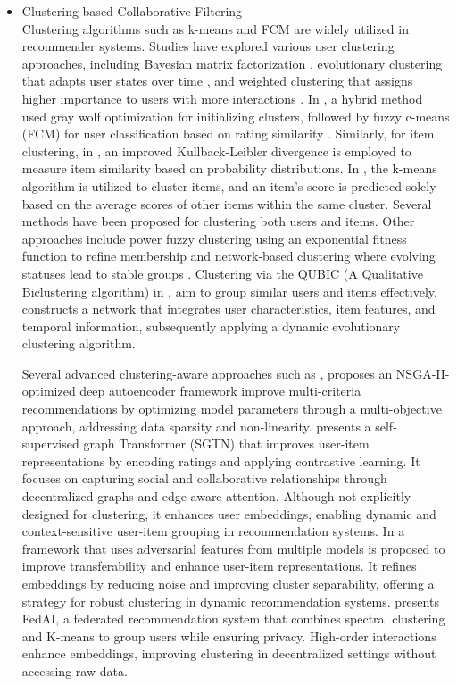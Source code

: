 \documentclass{article}
\theoremstyle{plain}
\theoremstyle{definition}
\theoremstyle{remark}
\begin{document}
\begin{itemize}
\item[a) ] Clustering-based Collaborative Filtering \\
Clustering algorithms such as k-means\cite{dakhel2011new, zahra2015novel, ranjan2018category, kant2017leaderrank} and FCM\cite{birtolo2013advances} are widely utilized in recommender systems. Studies have explored various user clustering approaches, including Bayesian matrix factorization \cite{bobadilla2018recommender}, evolutionary clustering that adapts user states over time \cite{liji2018improved}, and weighted clustering that assigns higher importance to users with more interactions \cite{salah2015dynamic}. In \cite{katarya2018recommender}, a hybrid method used gray wolf optimization for initializing clusters, followed by fuzzy c-means (FCM) for user classification based on rating similarity .
Similarly, for item clustering, in \cite{deng2019novel}, an improved Kullback-Leibler divergence is employed to measure item similarity based on probability distributions. In \cite{kant2017leaderrank}, the k-means algorithm is utilized to cluster items, and an item's score is predicted solely based on the average scores of other items within the same cluster. Several methods have been proposed for clustering both users and items. Other approaches include power fuzzy clustering using an exponential fitness function to refine membership \cite{treerattanapitak2012exponential} and network-based clustering where evolving statuses lead to stable groups \cite{chen2017evolutionary}. Clustering via the QUBIC (A Qualitative Biclustering algorithm) in \cite{singh2018impact}, aim to group similar users and items effectively. \cite{science2018dynamic} constructs a network that integrates user characteristics, item features, and temporal information, subsequently applying a dynamic evolutionary clustering algorithm.

Several advanced clustering-aware approaches such as \cite{rajput2025nsga}, proposes an NSGA-II-optimized deep autoencoder framework improve multi-criteria recommendations by optimizing model parameters through a multi-objective approach, addressing data sparsity and non-linearity. \cite{li2025self} presents a self-supervised graph Transformer (SGTN) that improves user-item representations by encoding ratings and applying contrastive learning. It focuses on capturing social and collaborative relationships through decentralized graphs and edge-aware attention. Although not explicitly designed for clustering, it enhances user embeddings, enabling dynamic and context-sensitive user-item grouping in recommendation systems. In \cite{qian2025ifm} a framework that uses adversarial features from multiple models is proposed to improve transferability and enhance user-item representations. It refines embeddings by reducing noise and improving cluster separability, offering a strategy for robust clustering in dynamic recommendation systems. \cite{he2025fedai} presents FedAI, a federated recommendation system that combines spectral clustering and K-means to group users while ensuring privacy. High-order interactions enhance embeddings, improving clustering in decentralized settings without accessing raw data.



\end{itemize}
\end{document}
